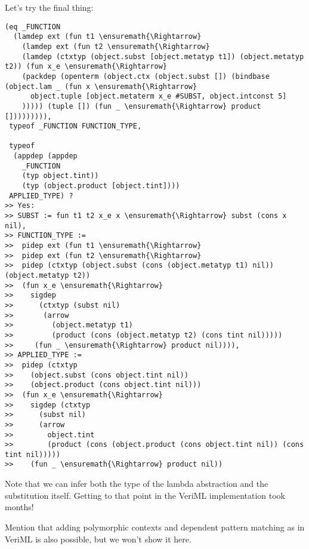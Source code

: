 Let's try the final thing:

\begin{verbatim}
(eq _FUNCTION
  (lamdep ext (fun t1 \ensuremath{\Rightarrow}
    (lamdep ext (fun t2 \ensuremath{\Rightarrow}
    (lamdep (ctxtyp (object.subst [object.metatyp t1]) (object.metatyp t2)) (fun x_e \ensuremath{\Rightarrow}
    (packdep (openterm (object.ctx (object.subst []) (bindbase (object.lam _ (fun x \ensuremath{\Rightarrow}
      object.tuple [object.metaterm x_e #SUBST, object.intconst 5]
    ))))) (tuple []) (fun _ \ensuremath{\Rightarrow} product [])))))))),
 typeof _FUNCTION FUNCTION_TYPE,

 typeof 
  (appdep (appdep 
    _FUNCTION 
    (typ object.tint)) 
    (typ (object.product [object.tint])))
 APPLIED_TYPE) ?
>> Yes:
>> SUBST := fun t1 t2 x_e x \ensuremath{\Rightarrow} subst (cons x nil),
>> FUNCTION_TYPE :=
>>  pidep ext (fun t1 \ensuremath{\Rightarrow}
>>  pidep ext (fun t2 \ensuremath{\Rightarrow}
>>  pidep (ctxtyp (object.subst (cons (object.metatyp t1) nil)) (object.metatyp t2))
>>  (fun x_e \ensuremath{\Rightarrow}
>>    sigdep 
>>      (ctxtyp (subst nil) 
>>       (arrow
>>         (object.metatyp t1)
>>         (product (cons (object.metatyp t2) (cons tint nil)))))
>>     (fun _ \ensuremath{\Rightarrow} product nil)))),
>> APPLIED_TYPE :=
>>  pidep (ctxtyp
>>    (object.subst (cons object.tint nil))
>>    (object.product (cons object.tint nil)))
>>  (fun x_e \ensuremath{\Rightarrow}
>>    sigdep (ctxtyp
>>      (subst nil)
>>      (arrow
>>        object.tint
>>        (product (cons (object.product (cons object.tint nil)) (cons tint nil)))))
>>    (fun _ \ensuremath{\Rightarrow} product nil))
\end{verbatim}

Note that we can infer both the type of the lambda abstraction and the
substitution itself. Getting to that point in the VeriML implementation
took months!

Mention that adding polymorphic contexts and dependent pattern matching
as in VeriML is also possible, but we won't show it here.
